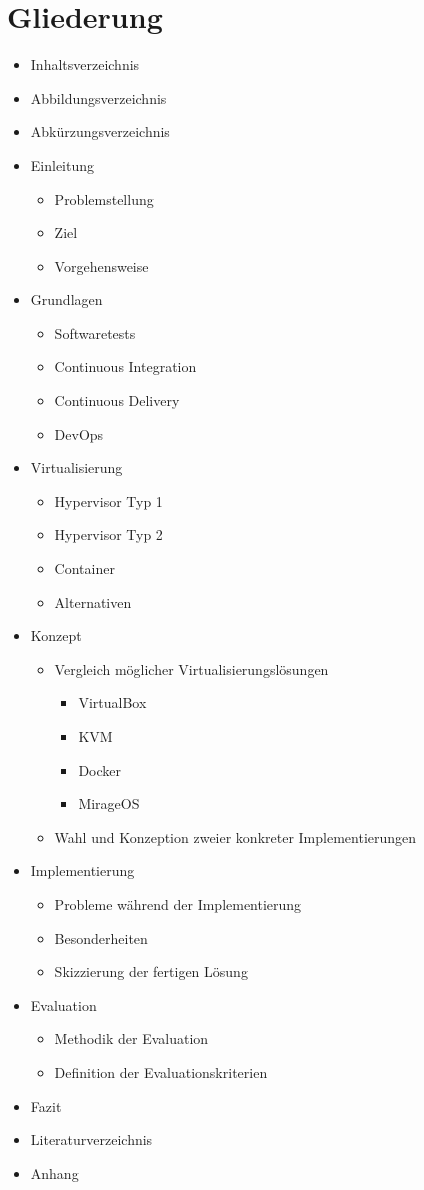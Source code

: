 \section{Gliederung}

\begin{itemize}
\item Inhaltsverzeichnis
\item Abbildungsverzeichnis
\item Abkürzungsverzeichnis
\item Einleitung
    \begin{itemize}
    \item Problemstellung
    \item Ziel
    \item Vorgehensweise
    \end{itemize}
\item Grundlagen
    \begin{itemize}
    \item Softwaretests
    \item Continuous Integration
    \item Continuous Delivery
    \item DevOps
    \end{itemize}
\item Virtualisierung
    \begin{itemize}
    \item Hypervisor Typ 1
    \item Hypervisor Typ 2
    \item Container
    \item Alternativen
    \end{itemize}
\item Konzept
    \begin{itemize}
    \item Vergleich möglicher Virtualisierungslösungen
        \begin{itemize}
        \item VirtualBox
        \item KVM
        \item Docker
        \item MirageOS
        \end{itemize}
    \item Wahl und Konzeption zweier konkreter Implementierungen
    \end{itemize}
\item Implementierung
    \begin{itemize}
    \item Probleme während der Implementierung
    \item Besonderheiten
    \item Skizzierung der fertigen Lösung
    \end{itemize}
\item Evaluation
    \begin{itemize}
    \item Methodik der Evaluation
    \item Definition der Evaluationskriterien
    \end{itemize}
\item Fazit
\item Literaturverzeichnis
\item Anhang
\end{itemize}
